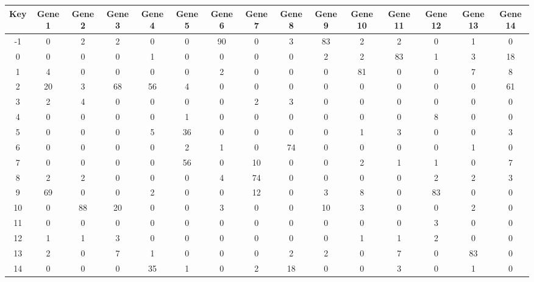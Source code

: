 \begin{tabular}{|c|c|c|c|c|c|c|c|c|c|c|c|c|c|c|}
\hline
Key & Gene 1 & Gene 2 & Gene 3 & Gene 4 & Gene 5 & Gene 6 & Gene 7 & Gene 8 & Gene 9 & Gene 10 & Gene 11 & Gene 12 & Gene 13 & Gene 14 \\
\hline
-1 & 0 & 2 & 2 & 0 & 0 & 90 & 0 & 3 & 83 & 2 & 2 & 0 & 1 & 0 \\
0 & 0 & 0 & 0 & 1 & 0 & 0 & 0 & 0 & 2 & 2 & 83 & 1 & 3 & 18 \\
1 & 4 & 0 & 0 & 0 & 0 & 2 & 0 & 0 & 0 & 81 & 0 & 0 & 7 & 8 \\
2 & 20 & 3 & 68 & 56 & 4 & 0 & 0 & 0 & 0 & 0 & 0 & 0 & 0 & 61 \\
3 & 2 & 4 & 0 & 0 & 0 & 0 & 2 & 3 & 0 & 0 & 0 & 0 & 0 & 0 \\
4 & 0 & 0 & 0 & 0 & 1 & 0 & 0 & 0 & 0 & 0 & 0 & 8 & 0 & 0 \\
5 & 0 & 0 & 0 & 5 & 36 & 0 & 0 & 0 & 0 & 1 & 3 & 0 & 0 & 3 \\
6 & 0 & 0 & 0 & 0 & 2 & 1 & 0 & 74 & 0 & 0 & 0 & 0 & 1 & 0 \\
7 & 0 & 0 & 0 & 0 & 56 & 0 & 10 & 0 & 0 & 2 & 1 & 1 & 0 & 7 \\
8 & 2 & 2 & 0 & 0 & 0 & 4 & 74 & 0 & 0 & 0 & 0 & 2 & 2 & 3 \\
9 & 69 & 0 & 0 & 2 & 0 & 0 & 12 & 0 & 3 & 8 & 0 & 83 & 0 & 0 \\
10 & 0 & 88 & 20 & 0 & 0 & 3 & 0 & 0 & 10 & 3 & 0 & 0 & 2 & 0 \\
11 & 0 & 0 & 0 & 0 & 0 & 0 & 0 & 0 & 0 & 0 & 0 & 3 & 0 & 0 \\
12 & 1 & 1 & 3 & 0 & 0 & 0 & 0 & 0 & 0 & 1 & 1 & 2 & 0 & 0 \\
13 & 2 & 0 & 7 & 1 & 0 & 0 & 0 & 2 & 2 & 0 & 7 & 0 & 83 & 0 \\
14 & 0 & 0 & 0 & 35 & 1 & 0 & 2 & 18 & 0 & 0 & 3 & 0 & 1 & 0 \\
\hline
\end{tabular}